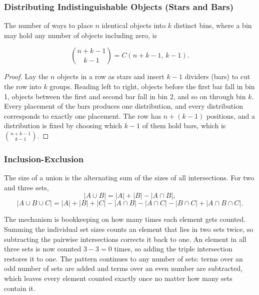 \subsubsection{Distributing Indistinguishable Objects (Stars and Bars)}

\begin{theorem}
The number of ways to place $n$ identical objects into $k$ distinct bins, where a bin may hold any number of objects including zero, is

\[
\binom{n + k - 1}{\,k - 1\,} = C(n + k - 1,\, k - 1).
\]
\end{theorem}

\begin{proof}
Lay the $n$ objects in a row as stars and insert $k-1$ dividers (bars) to cut the row into $k$ groups. Reading left to right, objects before the first bar fall in bin 1, objects between the first and second bar fall in bin 2, and so on through bin $k$. Every placement of the bars produces one distribution, and every distribution corresponds to exactly one placement. The row has $n + (k-1)$ positions, and a distribution is fixed by choosing which $k-1$ of them hold bars, which is $\binom{n+k-1}{k-1}$.
\end{proof}

\subsubsection{Inclusion-Exclusion}

\begin{theorem}
The size of a union is the alternating sum of the sizes of all intersections. For two and three sets,
\[
|A \cup B| = |A| + |B| - |A \cap B|,
\]
\[
|A \cup B \cup C| = |A| + |B| + |C| - |A\cap B| - |A\cap C| - |B\cap C| + |A\cap B\cap C|.
\]
\end{theorem}

The mechanism is bookkeeping on how many times each element gets counted. Summing the individual set sizes counts an element that lies in two sets twice, so subtracting the pairwise intersections corrects it back to one. An element in all three sets is now counted $3 - 3 = 0$ times, so adding the triple intersection restores it to one. The pattern continues to any number of sets: terms over an odd number of sets are added and terms over an even number are subtracted, which leaves every element counted exactly once no matter how many sets contain it.

\vspace{2em}

